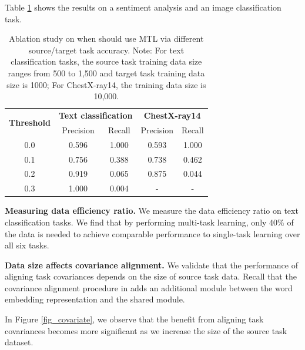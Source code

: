 Table \ref{tab:mtl_better_than_stl} shows the results on a sentiment analysis and an image classification task.

\begin{table}
\begin{center}
  \begin{tabular}{c c c c c}
  \toprule
    \multirow{2}{*}{{\bf Threshold}}  & \multicolumn{2}{c}{{\bf Text classification}} & \multicolumn{2}{c}{{\bf ChestX-ray14}} \\
    & Precision &  Recall & Precision &  Recall \\
    \cmidrule(lr){1-1} \cmidrule(lr){2-3} \cmidrule(lr){4-5}
    0.0 & 0.596 & 1.000 & 0.593 & 1.000 \\
    0.1 & 0.756 & 0.388 & 0.738 & 0.462 \\
    0.2 & 0.919 & 0.065 & 0.875 & 0.044 \\	
    0.3 & 1.000 & 0.004 &     - &     - \\
  \bottomrule
  \end{tabular}
\end{center}
\caption{Ablation study on when should use MTL via different source/target task accuracy. Note: For text classification tasks, the source task training data size ranges from 500 to 1,500 and target task training data size is 1000; For ChestX-ray14, the training data size is 10,000.}
\label{tab:mtl_better_than_stl}
\end{table}

\textbf{Measuring data efficiency ratio.}
We measure the data efficiency ratio on text classification tasks.
We find that by performing multi-task learning, only 40$\%$ of the data is needed to achieve comparable performance to single-task learning over all six tasks.

\textbf{Data size affects covariance alignment.}
We validate that the performance of aligning task covariances depends on the size of source task data.
Recall that the covariance alignment procedure in \cite{WZR20} adds an additional module between the word embedding representation and the shared module.

In Figure \ref{fig_covariate}, we observe that the benefit from aligning task covariances becomes more significant as we increase the size of the source task dataset.

